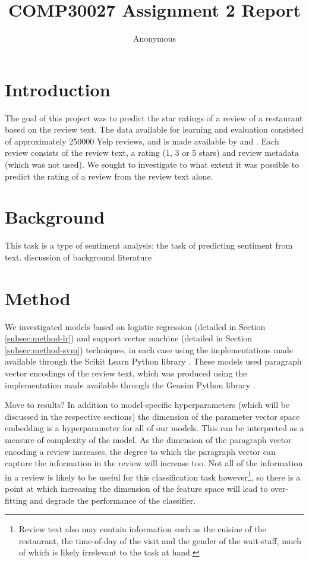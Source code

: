\documentclass[11pt]{article}
\title{COMP30027 Assignment 2 Report}
\author
{Anonymous}
\newcommand{\drafting}[1]{\textcolor{OliveGreen}{#1}}
\begin{document}
\maketitle

\section{Introduction}
The goal of this project was to predict the star ratings of a review of a restaurant based on the review text. The data available for learning and evaluation consisted of approximately 250000 Yelp reviews, and is made available by \cite{medhat_sentiment_2014} and \cite{rayana_collective_2015}. Each review consists of the review text, a rating (1, 3 or 5 stars) and review metadata (which was not used). We sought to investigate to what extent it was possible to predict the rating of a review from the review text alone. 

\section{Background}
This task is a type of sentiment analysis: the task of predicting sentiment from text. \drafting{discussion of background literature}
    
\section{Method} \label{sec:method}
We investigated models based on logistic regression (detailed in Section \ref{subsec:method-lr}) and support vector machine (detailed in Section \ref{subsec:method-svm}) techniques, in each case using the implementations made available through the Scikit Learn Python library \cite{sklearn_pedregosa_scikit-learn_2011}. These models used paragraph vector encodings of the review text, which was produced using the implementation made available through the Gensim Python library \cite{gensim_rehurek_software_2010}. 

\drafting{Move to results?}
In addition to model-specific hyperparameters (which will be discussed in the respective sections) the dimension of the parameter vector space embedding is a hyperparameter for all of our models. This can be interpreted as a measure of complexity of the model. As the dimension of the paragraph vector encoding a review increases, the degree to which the paragraph vector can capture the information in the review will increase too. Not all of the information in a review is likely to be useful for this classification task however\footnote{Review text also may contain information such as the cuisine of the restaurant, the time-of-day of the visit and the gender of the wait-staff, much of which is likely irrelevant to the task at hand.}, so there is a point at which increasing the dimension of the feature space will lead to over-fitting and degrade the performance of the classifier. 
\end{document}
